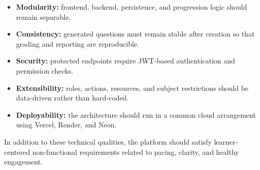 \begin{itemize}
  \item \textbf{Modularity:} frontend, backend, persistence, and progression logic should remain separable.
  \item \textbf{Consistency:} generated questions must remain stable after creation so that grading and reporting are reproducible.
  \item \textbf{Security:} protected endpoints require JWT-based authentication and permission checks.
  \item \textbf{Extensibility:} roles, actions, resources, and subject restrictions should be data-driven rather than hard-coded.
  \item \textbf{Deployability:} the architecture should run in a common cloud arrangement using Vercel, Render, and Neon.
\end{itemize}

In addition to these technical qualities, the platform should satisfy learner-centered non-functional requirements related to pacing, clarity, and healthy engagement.

